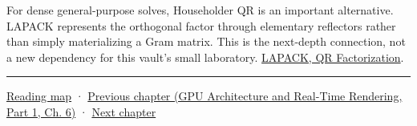 For dense general-purpose solves, Householder QR is an important alternative. LAPACK represents the orthogonal factor through elementary reflectors rather than simply materializing a Gram matrix. This is the next-depth connection, not a new dependency for this vault's small laboratory. \href{https://www.netlib.org/lapack/lug/node40.html}{LAPACK, QR Factorization}.

\begin{center}\rule{0.5\linewidth}{0.5pt}\end{center}

\hyperref[volume-reading-map]{Reading map} · \href{../06-GPU-Architecture-and-Real-Time-Rendering-P01/main.pdf\#nameddest=01-foundations-i-ch016-profile-gpus-and-respect-apple-ownership-boundaries}{Previous chapter (GPU Architecture and Real-Time Rendering, Part 1, Ch. 6)} · \hyperref[01-foundations-i-ch018-vectors-for-light-and-frames]{Next chapter}
